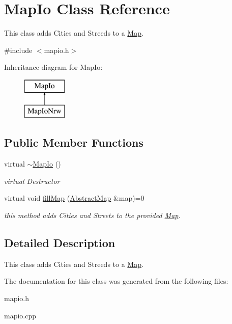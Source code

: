\hypertarget{class_map_io}{}\section{Map\+Io Class Reference}
\label{class_map_io}


This class adds Cities and Streeds to a \hyperlink{class_map}{Map}.  




{\ttfamily \#include $<$mapio.\+h$>$}

Inheritance diagram for Map\+Io\+:\begin{figure}[H]
\begin{center}
\leavevmode
\includegraphics[height=2.000000cm]{class_map_io}
\end{center}
\end{figure}
\subsection*{Public Member Functions}
\begin{DoxyCompactItemize}
\item 
\mbox{\label{class_map_io_a72ae6ca54e382dc9cad4b92e92df90c2}} 
virtual \hyperlink{class_map_io_a72ae6ca54e382dc9cad4b92e92df90c2}{$\sim$\+Map\+Io} ()
\begin{DoxyCompactList}\small\item\em virtual Destructor \end{DoxyCompactList}\item 
\mbox{\label{class_map_io_af33256d5aeeb5e36d26660da24bc8ec9}} 
virtual void \hyperlink{class_map_io_af33256d5aeeb5e36d26660da24bc8ec9}{fill\+Map} (\hyperlink{class_abstract_map}{Abstract\+Map} \&map)=0
\begin{DoxyCompactList}\small\item\em this method adds Cities and Streets to the provided \hyperlink{class_map}{Map}. \end{DoxyCompactList}\end{DoxyCompactItemize}


\subsection{Detailed Description}
This class adds Cities and Streeds to a \hyperlink{class_map}{Map}. 

The documentation for this class was generated from the following files\+:\begin{DoxyCompactItemize}
\item 
mapio.\+h\item 
mapio.\+cpp\end{DoxyCompactItemize}
